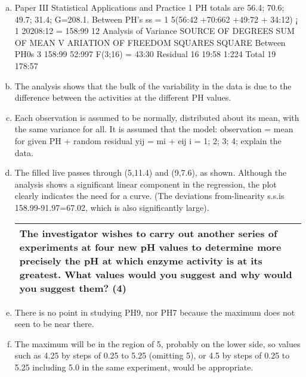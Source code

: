 \documentclass[a4paper,12pt]{article}
\begin{document}
\begin{enumerate}[(a)]
\item 


Paper III
Statistical Applications and Practice
1 PH totals are 56.4; 70.6; 49.7; 31.4; G=208.1. Between PH’s ss = 1
5(56:42 +70:662 +49:72 +
34:12) ¡ 1
20208:12 = 158:99
12
Analysis of Variance
SOURCE OF DEGREES SUM OF MEAN
V ARIATION OF FREEDOM SQUARES SQUARE
Between PH0s 3 158:99 52:997 F(3;16) = 43:30
Residual 16 19:58 1:224
Total 19 178:57
\item The analysis shows that the bulk of the variability in the data is due to the difference
between the activities at the different PH values.
\item Each observation is assumed to be normally,
distributed about its mean, with the same variance for all. It is assumed that the model:
observation = mean for given PH + random residual yij = mi + eij i = 1; 2; 3; 4; explain
the data.
\item The filled live passes through (5,11.4) and (9,7.6), as shown. Although the analysis shows a significant
linear component in the regression, the plot clearly indicates the need for a curve. (The
deviations from-linearity s.s.is 158.99-91.97=67.02, which is also significantly large). 


\begin{table}[ht!]
 \centering
 \begin{tabular}{|p{15cm}|}
 \hline  
 
 
 
The investigator wishes to carry out another series of experiments at four new pH values to determine more precisely the pH at which enzyme activity is at its greatest.  What values would you suggest and why would you suggest them?     (4) 
\\ \hline
  \end{tabular}
\end{table}

\item There is
no point in studying PH9, nor PH7 because the maximum does not seen to be near there.
\item The maximum will be in the region of 5, probably on the lower side, so values such as 4.25
by steps of 0.25 to 5.25 (omitting 5), or 4.5 by steps of 0.25 to 5.25 including 5.0 in the same
experiment, would be appropriate.

\end{enumerate}
\end{document}
